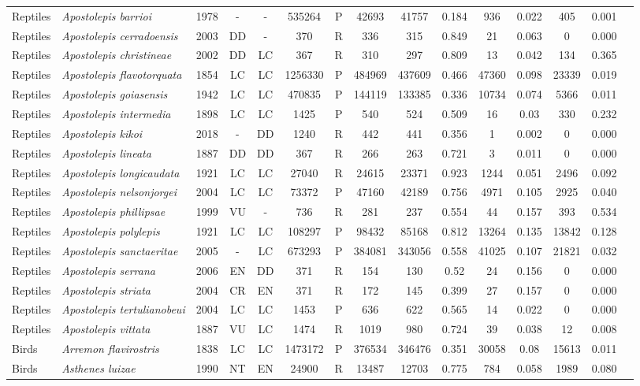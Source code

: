 \documentclass[12pt,openright,oneside,a4paper,english]{abntex2}
\begin{document}
\begin{landscape}
\begin{longtable}{llccccccccccccc}
		Reptiles&\textit{Apostolepis barrioi}&1978&-&-&535264&P&42693&41757&0.184&936&0.022&405&0.001\\
		Reptiles&\textit{Apostolepis cerradoensis}&2003&DD&-&370&R&336&315&0.849&21&0.063&0&0.000\\
		Reptiles&\textit{Apostolepis christineae}&2002&DD&LC&367&R&310&297&0.809&13&0.042&134&0.365\\
		Reptiles&\textit{Apostolepis flavotorquata}&1854&LC&LC&1256330&P&484969&437609&0.466&47360&0.098&23339&0.019\\
		Reptiles&\textit{Apostolepis goiasensis}&1942&LC&LC&470835&P&144119&133385&0.336&10734&0.074&5366&0.011\\
		Reptiles&\textit{Apostolepis intermedia}&1898&LC&LC&1425&P&540&524&0.509&16&0.03&330&0.232\\
		Reptiles&\textit{Apostolepis kikoi}&2018&-&DD&1240&R&442&441&0.356&1&0.002&0&0.000\\
		Reptiles&\textit{Apostolepis lineata}&1887&DD&DD&367&R&266&263&0.721&3&0.011&0&0.000\\
		Reptiles&\textit{Apostolepis longicaudata}&1921&LC&LC&27040&R&24615&23371&0.923&1244&0.051&2496&0.092\\
		Reptiles&\textit{Apostolepis nelsonjorgei}&2004&LC&LC&73372&P&47160&42189&0.756&4971&0.105&2925&0.040\\
		Reptiles&\textit{Apostolepis phillipsae}&1999&VU&-&736&R&281&237&0.554&44&0.157&393&0.534\\
		Reptiles&\textit{Apostolepis polylepis}&1921&LC&LC&108297&P&98432&85168&0.812&13264&0.135&13842&0.128\\
		Reptiles&\textit{Apostolepis sanctaeritae}&2005&-&LC&673293&P&384081&343056&0.558&41025&0.107&21821&0.032\\
		Reptiles&\textit{Apostolepis serrana}&2006&EN&DD&371&R&154&130&0.52&24&0.156&0&0.000\\
		Reptiles&\textit{Apostolepis striata}&2004&CR&EN&371&R&172&145&0.399&27&0.157&0&0.000\\
		Reptiles&\textit{Apostolepis tertulianobeui}&2004&LC&LC&1453&P&636&622&0.565&14&0.022&0&0.000\\
		Reptiles&\textit{Apostolepis vittata}&1887&VU&LC&1474&R&1019&980&0.724&39&0.038&12&0.008\\
		Birds&\textit{Arremon flavirostris}&1838&LC&LC&1473172&P&376534&346476&0.351&30058&0.08&15613&0.011\\
		Birds&\textit{Asthenes luizae}&1990&NT&EN&24900&R&13487&12703&0.775&784&0.058&1989&0.080\\

\end{longtable}
\end{landscape}
\end{document}
